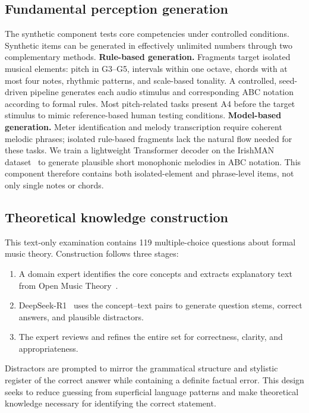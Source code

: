 \documentclass{article}
\begin{document}
\subsection{Fundamental perception generation}
The synthetic component tests core competencies under controlled conditions. Synthetic items can be generated in effectively unlimited numbers through two complementary methods.
\textbf{Rule-based generation.} Fragments target isolated musical elements: pitch in G3--G5, intervals within one octave, chords with at most four notes, rhythmic patterns, and scale-based tonality. A controlled, seed-driven pipeline generates each audio stimulus and corresponding ABC notation according to formal rules. Most pitch-related tasks present A4 before the target stimulus to mimic reference-based human testing conditions.
\textbf{Model-based generation.} Meter identification and melody transcription require coherent melodic phrases; isolated rule-based fragments lack the natural flow needed for these tasks. We train a lightweight Transformer decoder on the IrishMAN dataset~\cite{DBLP:conf/hcmir/WuLY023} to generate plausible short monophonic melodies in ABC notation. This component therefore contains both isolated-element and phrase-level items, not only single notes or chords.

\subsection{Theoretical knowledge construction}
This text-only examination contains 119 multiple-choice questions about formal music theory. Construction follows three stages:
\begin{enumerate}
\item A domain expert identifies the core concepts and extracts explanatory text from Open Music Theory~\cite{openmusictheory2021}.
\item DeepSeek-R1~\cite{DBLP:journals/corr/abs-2501-12948} uses the concept--text pairs to generate question stems, correct answers, and plausible distractors.
\item The expert reviews and refines the entire set for correctness, clarity, and appropriateness.
\end{enumerate}
Distractors are prompted to mirror the grammatical structure and stylistic register of the correct answer while containing a definite factual error. 
This design seeks to reduce guessing from superficial language patterns and make theoretical knowledge necessary for identifying the correct statement. 
\end{document}
